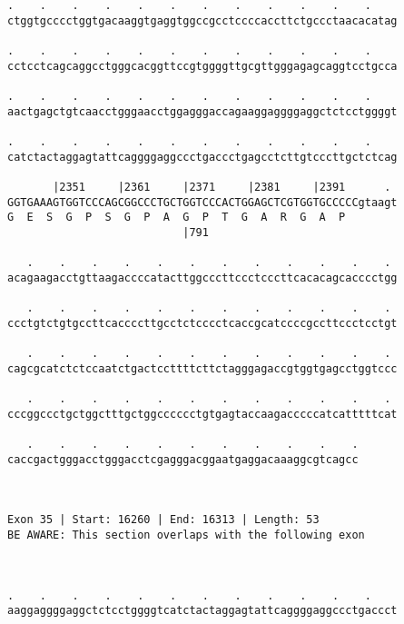 \documentclass{article}
\begin{document}
\begin{Verbatim}
.    .    .    .    .    .    .    .    .    .    .    .    
ctggtgcccctggtgacaaggtgaggtggccgcctccccaccttctgccctaacacatag
                                                            
.    .    .    .    .    .    .    .    .    .    .    .    
cctcctcagcaggcctgggcacggttccgtggggttgcgttgggagagcaggtcctgcca
                                                            
.    .    .    .    .    .    .    .    .    .    .    .    
aactgagctgtcaacctgggaacctggagggaccagaaggaggggaggctctcctggggt
                                                            
.    .    .    .    .    .    .    .    .    .    .    .    
catctactaggagtattcaggggaggccctgaccctgagcctcttgtcccttgctctcag
                                                            
       |2351     |2361     |2371     |2381     |2391      . 
GGTGAAAGTGGTCCCAGCGGCCCTGCTGGTCCCACTGGAGCTCGTGGTGCCCCCgtaagt
G  E  S  G  P  S  G  P  A  G  P  T  G  A  R  G  A  P        
                           |791                             
  
   .    .    .    .    .    .    .    .    .    .    .    . 
acagaagacctgttaagaccccatacttggcccttccctcccttcacacagcacccctgg
                                                            
   .    .    .    .    .    .    .    .    .    .    .    . 
ccctgtctgtgccttcaccccttgcctctcccctcaccgcatccccgccttccctcctgt
                                                            
   .    .    .    .    .    .    .    .    .    .    .    . 
cagcgcatctctccaatctgactccttttcttctagggagaccgtggtgagcctggtccc
                                                            
   .    .    .    .    .    .    .    .    .    .    .    . 
cccggccctgctggctttgctggcccccctgtgagtaccaagacccccatcatttttcat
                                                            
   .    .    .    .    .    .    .    .    .    .    .
caccgactgggacctgggacctcgagggacggaatgaggacaaaggcgtcagcc
                                                      
                                                      
 
Exon 35 | Start: 16260 | End: 16313 | Length: 53
BE AWARE: This section overlaps with the following exon



.    .    .    .    .    .    .    .    .    .    .    .    
aaggaggggaggctctcctggggtcatctactaggagtattcaggggaggccctgaccct
                                                            

\end{Verbatim}
\end{document}
